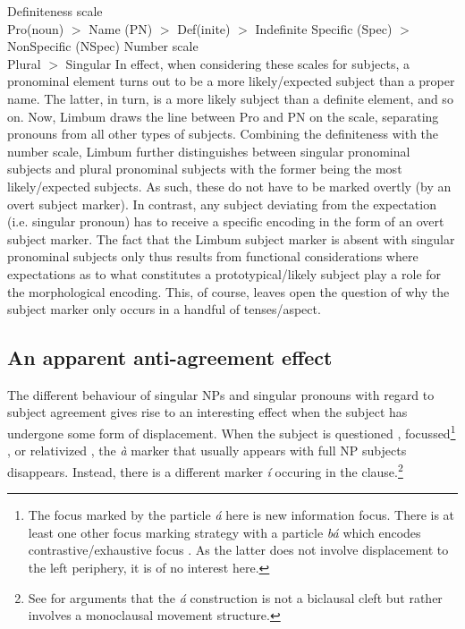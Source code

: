 \documentclass[output=paper]{langscibook}
\begin{document}
\ea Definiteness scale\label{ex:johanneshein:DEF}\\
Pro(noun) $>$ Name (PN) $>$ Def(inite) $>$ Indefinite Specific (Spec) $>$ NonSpecific (NSpec)
\ex Number scale\label{ex:johanneshein:NUM}\\
Plural $>$ Singular
\z 
In effect, when considering these scales for subjects, a pronominal
element turns out to be a more likely/expected subject than a proper
name. The latter, in turn, is a more likely subject than a definite
element, and so on. Now, Limbum draws the line between Pro and PN on
the scale, separating pronouns from all other types of
subjects. Combining the definiteness with the number scale, Limbum
further distinguishes between singular pronominal subjects and plural
pronominal subjects with the former being the most likely/expected
subjects. As such, these do not have to be marked overtly (by an overt
subject marker). In contrast, any subject deviating from the
expectation (i.e. singular pronoun) has to receive a specific encoding
in the form of an overt subject marker. The fact that the Limbum
subject marker is absent with singular pronominal subjects only thus
results from functional considerations where expectations as to what
constitutes a prototypical/likely subject play a role for the
morphological encoding. This, of course, leaves open the question of
why the subject marker only occurs in a handful of tenses/aspect.


\subsection{An apparent anti-agreement effect}

The different behaviour of singular NPs and singular pronouns with
regard to subject agreement gives rise to an interesting effect when
the subject has undergone some form of displacement. When the subject
is questioned , focussed\footnote{The focus marked by the
  particle \textit{á} here is new information focus. There is at
  least one other focus marking strategy with a particle \textit{bá}
  which encodes contrastive/exhaustive focus
  \citep{beckeretal19,driemel+nformi18}. As the latter does not
  involve displacement to the left periphery, it is of no interest
  here.} , or relativized , the \textit{à} marker
 that usually appears with full NP subjects disappears. Instead, there is a different marker \textit{í} occuring
in the clause.\footnote{See \citet{beckeretal19} for arguments that the
  \textit{á} construction is not a biclausal cleft but rather
  involves a monoclausal movement structure.}
\end{document}
